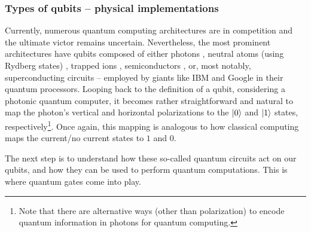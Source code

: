 \subsubsection*{Types of qubits – physical implementations}
\vspace*{-2.5mm}
Currently, numerous quantum computing architectures are in competition and the ultimate victor remains uncertain. Nevertheless, the most prominent architectures have qubits composed of either photons \cite{slussarenko2019photonic, Xanadu_Photonics}, neutral atoms (using Rydberg states) \cite{Henriet2020quantumcomputing, Wu_2021}, trapped ions \cite{bruzewicz2019trapped}, semiconductors \cite{Chatterjee2021}, or, most notably, superconducting circuits \cite{Huang_2020, SC_Qubits} – employed by giants like IBM and Google in their quantum processors. Looping back to the definition of a qubit, considering a photonic quantum computer, it becomes rather straightforward and natural to map the photon's vertical and horizontal polarizations to the $\ket{0}$ and $\ket{1}$ states, respectively\footnote{Note that there are alternative ways (other than polarization) to encode quantum information in photons for quantum computing.}. Once again, this mapping is analogous to how classical computing maps the current/no current states to $1$ and $0$.

The next step is to understand how these so-called quantum circuits act on our qubits, and how they can be used to perform quantum computations. This is where quantum gates come into play.




\vspace*{-2.5mm}
